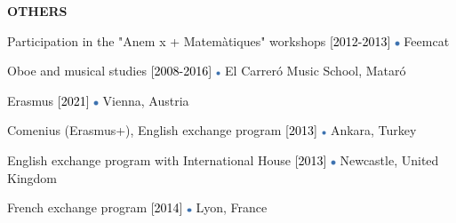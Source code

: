 \documentclass[../main.tex]{subfiles}
\begin{document}
    \vspace*{0.8cm}
    \textbf{\textcolor{myCV2}{OTHERS\underline{\hspace{16.42cm}}}}
        \vspace*{0.3cm}
        
        Participation in the "Anem x + Matemàtiques" workshops
        \textcolor{black}{[2012-2013]}
        \includegraphics[width=0.15cm]{assets/full.png} 
        Feemcat

        \vspace*{0.25cm}
        Oboe and musical studies
        \textcolor{black}{[2008-2016]}
        \includegraphics[width=0.15cm]{assets/full.png} 
        El Carreró Music School, Mataró

        \vspace*{0.25cm}
        Erasmus
        \textcolor{black}{[2021]}
        \includegraphics[width=0.15cm]{assets/full.png} 
        Vienna, Austria
        
        \vspace*{0.25cm}
        Comenius (Erasmus+), English exchange program
        \textcolor{black}{[2013]}
        \includegraphics[width=0.15cm]{assets/full.png} 
        Ankara, Turkey

        \vspace*{0.25cm}
        English exchange program with International House
        \textcolor{black}{[2013]}
        \includegraphics[width=0.15cm]{assets/full.png} 
        Newcastle, United Kingdom

        \vspace*{0.25cm}
        French exchange program
        \textcolor{black}{[2014]}
        \includegraphics[width=0.15cm]{assets/full.png} 
        Lyon, France
        
\end{document}

